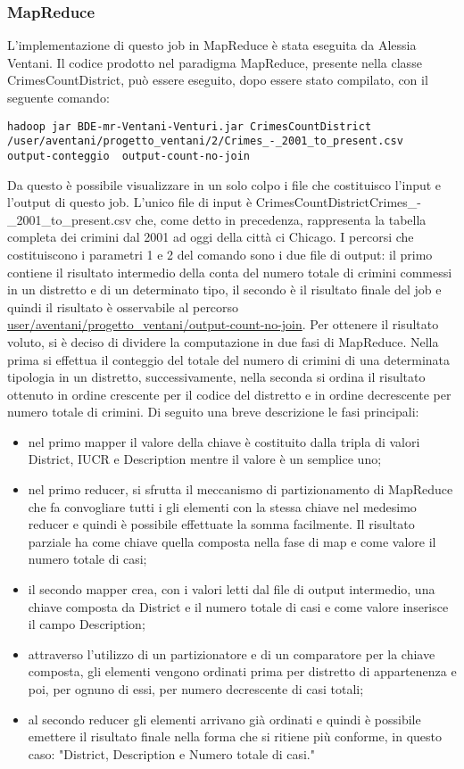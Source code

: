 \documentclass[10pt]{article}
\begin{document}
\subsubsection{MapReduce}
L'implementazione di questo job in MapReduce è stata eseguita da Alessia Ventani.
Il codice prodotto nel paradigma MapReduce, presente nella classe CrimesCountDistrict, può essere eseguito, dopo essere stato compilato, con il seguente comando:
\begin{lstlisting}
hadoop jar BDE-mr-Ventani-Venturi.jar CrimesCountDistrict 
/user/aventani/progetto_ventani/2/Crimes_-_2001_to_present.csv  
output-conteggio  output-count-no-join
\end{lstlisting}
Da questo è possibile visualizzare in un solo colpo i file che costituisco l'input e l'output di questo job. L'unico file di input è CrimesCountDistrictCrimes\_-\_2001\_to\_present.csv che, come detto in precedenza, rappresenta la tabella completa dei crimini dal 2001 ad oggi della città ci Chicago. I percorsi che costituiscono i parametri 1 e 2 del comando sono i due file di output: il primo contiene il risultato intermedio della conta del numero totale di crimini commessi in un distretto e di un determinato tipo, il secondo è il risultato finale del job e quindi il risultato è osservabile al percorso \url{user/aventani/progetto_ventani/output-count-no-join}.
Per ottenere il risultato voluto, si è deciso di dividere la computazione in due fasi di MapReduce. Nella prima si effettua il conteggio del totale del numero di crimini di una determinata tipologia in un distretto, successivamente, nella seconda si ordina il risultato ottenuto in ordine crescente per il codice del distretto e in ordine decrescente per numero totale di crimini.
Di seguito una breve descrizione le fasi principali:
\begin{itemize}
\item nel primo mapper il valore della chiave è costituito dalla tripla di valori District, IUCR e Description mentre il valore è un semplice uno;
\item nel primo reducer, si sfrutta il meccanismo di partizionamento di MapReduce che fa convogliare tutti i gli elementi con la stessa chiave nel medesimo reducer e quindi è possibile effettuate la somma facilmente. Il risultato parziale ha come chiave quella composta nella fase di map e come valore il numero totale di casi;
\item il secondo mapper crea, con i valori letti dal file di output intermedio, una chiave composta da District e il numero totale di casi e come valore inserisce il campo Description;
\item attraverso l'utilizzo di un partizionatore e di un comparatore per la chiave composta, gli elementi vengono ordinati prima per distretto di appartenenza e poi, per ognuno di essi, per numero decrescente di casi totali;
\item al secondo reducer gli elementi arrivano già ordinati e quindi è possibile emettere il risultato finale nella forma che si ritiene più conforme, in questo caso: "District, Description e Numero totale di casi."
\end{itemize}
\end{document}
